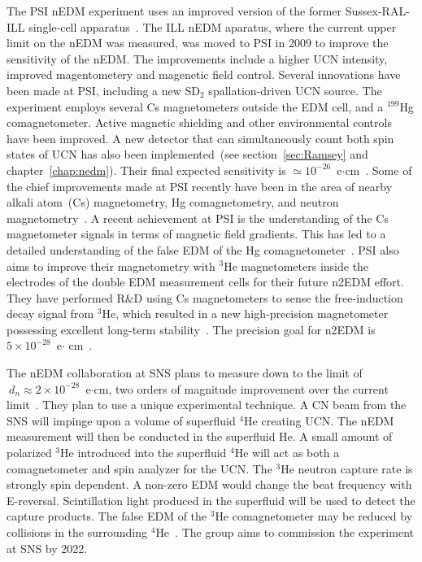 The PSI nEDM experiment uses an improved version of the former
Sussex-RAL-ILL single-cell apparatus~\cite{Altarev2010}. The ILL nEDM
aparatus, where the current upper limit on the nEDM was measured, was
moved to PSI in 2009 to improve the sensitivity of the nEDM. The
improvements include a higher UCN intensity, improved magentometery
and magenetic field control. Several innovations have been made at
PSI, including a new SD$_2$ spallation-driven UCN source. The
experiment employs several Cs magnetometers outside the EDM cell, and
a $^{199}$Hg comagnetometer. Active magnetic shielding and other
environmental controls have been improved. A new detector that can
simultaneously count both spin states of UCN has also been
implemented~(see section~\ref{sec:Ramsey} and
chapter~\ref{chap:nedm}). Their final expected sensitivity is
$\simeq 10^{-26}$~e$\cdot$cm~\cite{Schmidt2016}. Some of the chief
improvements made at PSI recently have been in the area of nearby
alkali atom~(Cs) magnetometry, Hg comagnetometry, and neutron
magnetometry~\cite{AFACH2014128}. A recent achievement at PSI is the
understanding of the Cs magnetometer signals in terms of magnetic
field gradients. This has led to a detailed understanding of the false
EDM of the Hg comagnetometer~\cite{Afach2015_2}.
PSI also aims to improve their magnetometry with $^3$He magnetometers
inside the electrodes of the double EDM measurement cells for their
future n2EDM effort. They have performed R\&D using Cs magnetometers
to sense the free-induction decay signal from $^3$He, which resulted
in a new high-precision magnetometer possessing excellent long-term
stability~\cite{Koch2015}. The precision goal for n2EDM is
$5 \times 10^{-28}$~e$\cdot$ cm~\cite{Bernhard_talk,baker2011search}.


The nEDM collaboration at SNS plans to measure down to the limit of
$\ d_n\approx 2 \times 10^{-28} $~e$\cdot$cm, two orders of magnitude
improvement over the current limit~\cite{peng2008neutron}.  They plan
to use a unique experimental technique. A CN beam from the SNS will
impinge upon a volume of superfluid $^4$He creating UCN. The nEDM
measurement will then be conducted in the superfluid He. A small amount
of polarized $^3$He introduced into the superfluid $^4$He will act as
both a comagnetometer and spin analyzer for the UCN. The $^3$He
neutron capture rate is strongly spin dependent. A non-zero EDM would
change the beat frequency with E-reversal. Scintillation light
produced in the superfluid will be used to detect the capture
products. The false EDM of the $^3$He comagnetometer may be reduced by
collisions in the surrounding $^4$He~\cite{LamGol2005}. The group aims
to commission the experiment at SNS by 2022.


